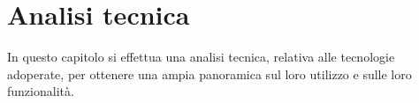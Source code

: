 \clearpage
\chapter{Analisi tecnica}\label{ch:technical-analysis}
In questo capitolo si effettua una analisi tecnica, relativa alle tecnologie adoperate, per ottenere una ampia panoramica sul loro utilizzo e sulle loro funzionalità.

